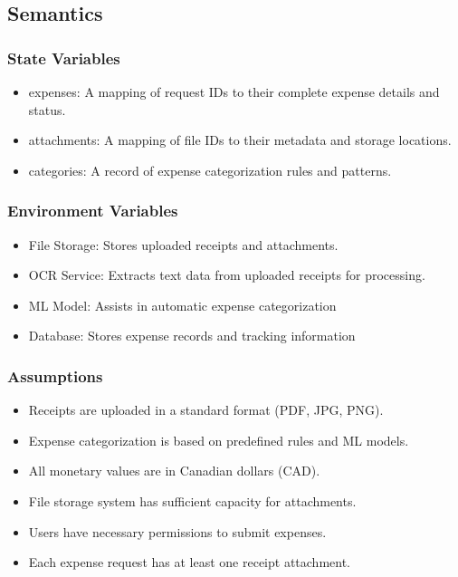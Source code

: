 \documentclass[12pt, titlepage]{article}
\begin{document}
\subsection{Semantics}
\subsubsection{State Variables}
\begin{itemize}
    \item expenses: A mapping of request IDs to their complete expense details and status.
    \item attachments: A mapping of file IDs to their metadata and storage locations.
    \item categories: A record of expense categorization rules and patterns.
\end{itemize}

\subsubsection{Environment Variables}
\begin{itemize}
    \item File Storage: Stores uploaded receipts and attachments.
    \item OCR Service: Extracts text data from uploaded receipts for processing.
    \item ML Model: Assists in automatic expense categorization
    \item Database: Stores expense records and tracking information
\end{itemize}

\subsubsection{Assumptions}
\begin{itemize}
    \item Receipts are uploaded in a standard format (PDF, JPG, PNG).
    \item Expense categorization is based on predefined rules and ML models.
    \item All monetary values are in Canadian dollars (CAD).
    \item File storage system has sufficient capacity for attachments.
    \item Users have necessary permissions to submit expenses.
    \item Each expense request has at least one receipt attachment.
\end{itemize}
\end{document}
